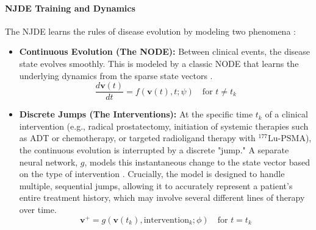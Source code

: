 \documentclass[11pt, a4paper]{article}
\begin{document}
\paragraph{NJDE Training and Dynamics}
The NJDE learns the rules of disease evolution by modeling two phenomena \cite{GwakSim2020}:
\begin{itemize}
    \item \textbf{Continuous Evolution (The NODE):} Between clinical events, the disease state evolves smoothly. This is modeled by a classic NODE that learns the underlying dynamics from the sparse state vectors \cite{BergHasenclever2018}.
    $$ \frac{d\mathbf{v}(t)}{dt} = f(\mathbf{v}(t), t; \psi) \quad \text{for } t \neq t_k $$
    \item \textbf{Discrete Jumps (The Interventions):} At the specific time $t_k$ of a clinical intervention (e.g., radical prostatectomy, initiation of systemic therapies such as ADT or chemotherapy, or targeted radioligand therapy with $^{\text{177}}\text{Lu-PSMA}$), the continuous evolution is interrupted by a discrete "jump." A separate neural network, $g$, models this instantaneous change to the state vector based on the type of intervention \cite{CuchieroLarsson2019, AbushaqraXue2022}. Crucially, the model is designed to handle multiple, sequential jumps, allowing it to accurately represent a patient's entire treatment history, which may involve several different lines of therapy over time.
    $$ \mathbf{v}^+ = g(\mathbf{v}(t_k), \text{intervention}_k; \phi) \quad \text{for } t = t_k $$
\end{itemize}
\end{document}

